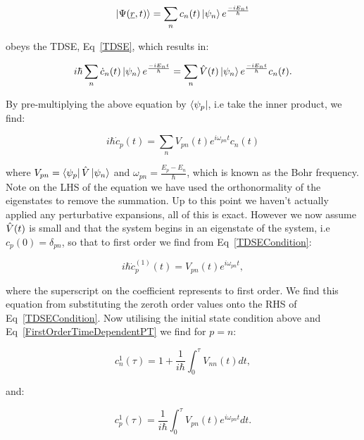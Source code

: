 \begin{equation}
    \ket{\Psi(\underline{r}, t)} = \sum_n c_n(t) \ket{\psi_n} e^\frac{-i E_n t}{\hbar}
    \label{GeneralTimeDependentPerturbationWavefunction}
\end{equation}

\noindent obeys the TDSE, Eq~\ref{TDSE}, which results in:

\begin{equation}
    i \hbar \sum_n \Dot{c}_n(t) \ket{\psi_n} e^\frac{-i E_n t}{\hbar} = \sum_n \Hat{V}(t) \ket{\psi_n} e^\frac{-i E_n t}{\hbar} c_n(t).
\end{equation}

\noindent By pre-multiplying the above equation by $\bra{\psi_p}$, i.e take the inner product, we find:

\begin{equation}
    i \hbar \Dot{c}_p(t) = \sum_n V_{pn}(t) e^{i \omega_{pn} t} c_n(t)
    \label{TDSECondition}
\end{equation}

\noindent where $V_{pn} = \bra{\psi_p} \Hat{V} \ket{\psi_n}$ and $\omega_{pn} = \frac{E_p - E_n}{\hbar}$, which is known as the Bohr frequency. Note on the LHS of the equation we have used the orthonormality of the eigenstates to remove the summation. Up to this point we haven't actually applied any perturbative expansions, all of this is exact. However we now assume $\Hat{V}(t)$ is small and that the system begins in an eigenstate of the system, i.e $c_p(0) = \delta_{pn}$, so that to first order we find from Eq~\ref{TDSECondition}:

\begin{equation}
    i \hbar \Dot{c}^{(1)}_p(t) = V_{pn}(t) e^{i \omega_{pn} t},
    \label{FirstOrderTimeDependentPT}
\end{equation}

\noindent where the superscript on the coefficient represents to first order. We find this equation from substituting the zeroth order values onto the RHS of Eq~\ref{TDSECondition}. Now utilising the initial state condition above and Eq~\ref{FirstOrderTimeDependentPT} we find for $p = n$:

\begin{equation}
    c^{1}_n(\tau) = 1 + \frac{1}{i \hbar} \int_0^\tau V_{nn}(t) dt,
    \label{CoefficientN}
\end{equation}

\noindent and:

\begin{equation}
    c^{1}_p(\tau) = \frac{1}{i \hbar} \int_0^\tau V_{pn}(t)e^{i\omega_{pn}t} dt.
    \label{CoefficientP}
\end{equation}

